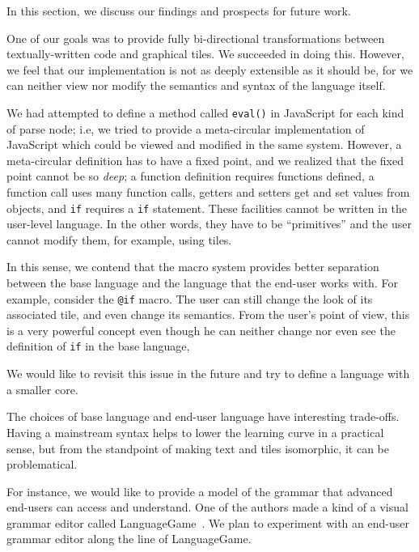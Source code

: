 \label{sec:discussion}

  In this section, we discuss our findings and prospects for future work.


  One of our goals was to provide fully bi-directional transformations
between textually-written code and graphical tiles.  We succeeded in doing this.  However,
we feel that our
implementation is not as deeply extensible as it should be,
for we can neither view nor modify the
semantics and syntax of the language itself.

  We had attempted to define a method called {\tt eval()} in
JavaScript for each kind of parse node; i.e, we tried to provide a
meta-circular implementation of JavaScript which
could be viewed and modified in the same system.  However, a
meta-circular definition has to have a fixed point, and we realized
that the fixed point cannot be so {\em deep}; a function definition
requires functions defined, a function call uses many function calls,
getters and setters get and set values from objects, and {\tt if}
requires a {\tt if} statement.  These facilities cannot be written in
the user-level language.  In the other words, they have to be
``primitives'' and the user cannot modify them, for example, using tiles.

  In this sense, we contend that the macro system provides better
separation between the base language and the language that the
end-user works with.  For example, consider the {\tt @if} macro.  The user can
still change the look of its associated tile, and even change its semantics.
From the user's point
of view, this is a very powerful concept even though he can neither
change nor even see the definition of {\tt if} in the base language,

  We would like to revisit this issue in the future and try to
define a language with a smaller core.


The choices of base language and end-user language have interesting
trade-offs.  Having a mainstream syntax helps to lower the
learning curve in a practical sense, but from the standpoint of
making text and tiles isomorphic, it can be problematical.

For instance, we would like to provide a model of the grammar that advanced end-users
can access and understand.  One of the authors made a kind of a visual
grammar editor called LanguageGame~\cite{ty03languagegame}.  We plan
to experiment with an end-user grammar editor along the line of
LanguageGame.

